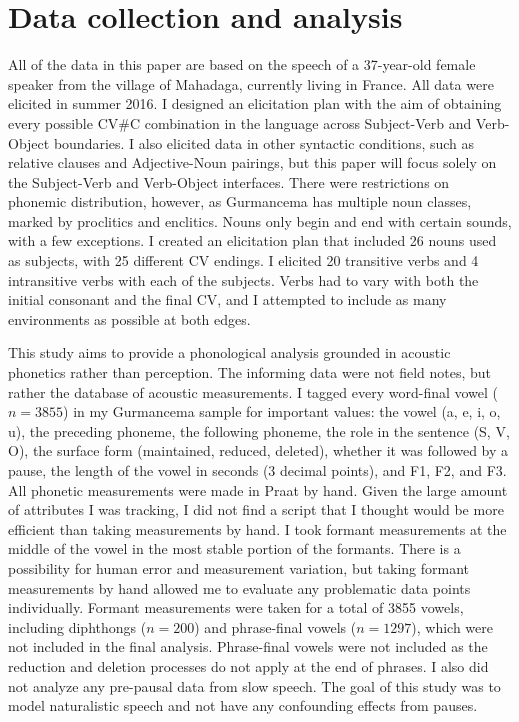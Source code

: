 \documentclass[output=paper,newtxmath,modfonts,nonflat,draftmode]{langsci/langscibook}
\begin{document}
\section{Data collection and analysis}\label{sec:baird:4}

All of the data in this paper are based on the speech of a 37-year-old female 
speaker from the village of Mahadaga, currently living in France. All data were elicited in summer 2016. I designed an elicitation plan with the aim of obtaining every possible CV\#C combination in the language across Subject-Verb and Verb-Object boundaries. I also elicited data in other syntactic conditions, such as relative clauses and Adjective-Noun pairings, but this paper will focus solely on the Subject-Verb and Verb-Object interfaces. There were restrictions on phonemic distribution, however, as Gurmancema has multiple noun classes, marked by proclitics and enclitics.  Nouns only begin and end with certain sounds, with a few exceptions. I created an elicitation plan that included 26 nouns used as subjects, with 25 different CV endings. I elicited 20 transitive verbs and 4 intransitive verbs with each of the subjects. Verbs had to vary with both the initial consonant and the final CV, and I attempted to include as many environments as possible at both edges. 

This study aims to provide a phonological analysis grounded in acoustic phonetics rather than perception. The informing data were not field notes, but rather the database of acoustic measurements. I tagged every word-final vowel ($n=3855$) in my Gurmancema sample for important values: the vowel (a, e, i, o, u), the preceding phoneme, the following phoneme, the role in the sentence (S, V, O), the surface form (maintained, reduced, deleted), whether it was followed by a pause, the length of the vowel in seconds (3 decimal points), and F1, F2, and 
F3. All phonetic measurements were made in Praat \citep{Boersma1996} by hand. Given the large amount of attributes I was tracking, I did not find a script that I thought would be more efficient than taking measurements by hand. I took formant measurements at the middle of the vowel in the most stable portion of the formants. There is a possibility for human error and measurement variation, but taking formant measurements by hand allowed me to evaluate any problematic data points individually. Formant measurements were taken for a total of 3855 vowels, including diphthongs ($n=200$) and phrase-final vowels ($n=1297$), which were not included in the final 
analysis. Phrase-final vowels were not included as the reduction and deletion processes do not apply at the end of phrases. I also did not analyze any pre-pausal data from slow speech. The goal of this study was to model naturalistic speech and not have any confounding effects from pauses. 
\end{document}
